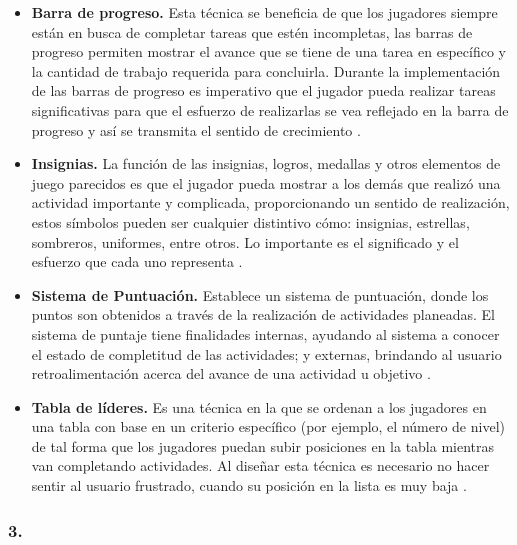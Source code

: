     \begin{itemize}
    \item
    {\bf Barra de progreso.}
        Esta técnica se beneficia de que los jugadores siempre están en busca de completar tareas
        que estén incompletas, las barras de progreso permiten mostrar el avance que se tiene de una
        tarea en específico y la cantidad de trabajo requerida para concluirla. Durante la
        implementación de las barras de progreso es imperativo que el jugador pueda realizar tareas
        significativas para que el esfuerzo de realizarlas se vea reflejado en la barra de progreso
        y así se transmita el sentido de crecimiento \cite[p. 113]{Octalysis}.

    \item
    {\bf Insignias.}
        La función de las insignias, logros, medallas y otros elementos de juego parecidos es que el
        jugador pueda mostrar a los demás que realizó una actividad importante y complicada,
        proporcionando un sentido de realización, estos símbolos pueden ser cualquier distintivo
        cómo: insignias, estrellas, sombreros, uniformes, entre otros. Lo importante es el
        significado y el esfuerzo que cada uno representa \cite[p. 117]{Octalysis}.

    \item
    {\bf Sistema de Puntuación.} %
        Establece un sistema de puntuación, donde los puntos son obtenidos a través de la realización
        de actividades planeadas. El sistema de puntaje tiene finalidades internas, ayudando al
        sistema a conocer el estado de completitud de las actividades; y externas, brindando al
        usuario retroalimentación acerca del avance de una actividad u objetivo
        \cite[p. 118]{Octalysis}.

    \item
    {\bf Tabla de líderes.}
        Es una técnica en la que se ordenan a los jugadores en una tabla con base en un criterio
        específico (por ejemplo, el número de nivel) de tal forma que los jugadores puedan subir
        posiciones en la tabla mientras van completando actividades. Al diseñar esta técnica es
        necesario no hacer sentir al usuario frustrado, cuando su posición en la lista es muy baja
        \cite[p. 121]{Octalysis}.
    \end{itemize}


\subsubsection{3. \principioIII} \label{subsec:prinpcioIII}

